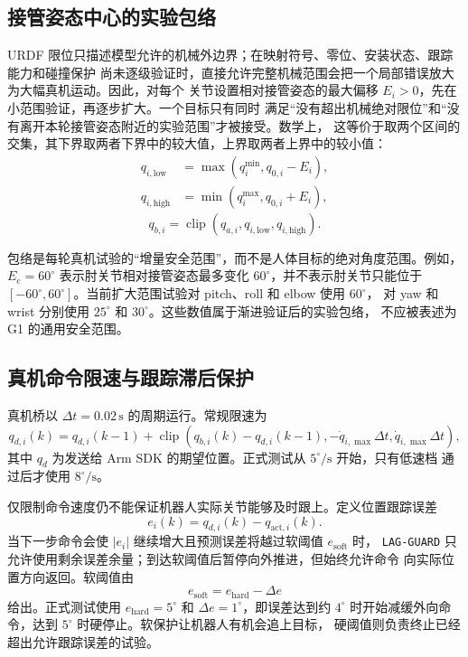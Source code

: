 \subsection{接管姿态中心的实验包络}
\label{subsec:ch5_takeover_envelope}

URDF 限位只描述模型允许的机械外边界；在映射符号、零位、安装状态、跟踪能力和碰撞保护
尚未逐级验证时，直接允许完整机械范围会把一个局部错误放大为大幅真机运动。因此，对每个
关节设置相对接管姿态的最大偏移 $E_i>0$，先在小范围验证，再逐步扩大。一个目标只有同时
满足“没有超出机械绝对限位”和“没有离开本轮接管姿态附近的实验范围”才被接受。数学上，
这等价于取两个区间的交集，其下界取两者下界中的较大值，上界取两者上界中的较小值：
\begin{align}
  q_{i,\mathrm{low}}
  &=\max(q_i^{\min},q_{0,i}-E_i),
  \label{eq:ch5_envelope_low}\\
  q_{i,\mathrm{high}}
  &=\min(q_i^{\max},q_{0,i}+E_i),
  \label{eq:ch5_envelope_high}
\end{align}
\begin{equation}
  q_{b,i}=\operatorname{clip}
  (q_{a,i},q_{i,\mathrm{low}},q_{i,\mathrm{high}}).
  \label{eq:ch5_takeover_envelope_clip}
\end{equation}

包络是每轮真机试验的“增量安全范围”，而不是人体目标的绝对角度范围。例如，
$E_e=60^\circ$ 表示肘关节相对接管姿态最多变化 $60^\circ$，并不表示肘关节只能位于
$[-60^\circ,60^\circ]$。当前扩大范围试验对 pitch、roll 和 elbow 使用 $60^\circ$，
对 yaw 和 wrist 分别使用 $25^\circ$ 和 $30^\circ$。这些数值属于渐进验证后的实验包络，
不应被表述为 G1 的通用安全范围。

\subsection{真机命令限速与跟踪滞后保护}
\label{subsec:ch5_rate_lag_guard}

真机桥以 $\Delta t=0.02\,\mathrm s$ 的周期运行。常规限速为
\begin{equation}
  q_{d,i}(k)=q_{d,i}(k-1)+
  \operatorname{clip}\left(
  q_{b,i}(k)-q_{d,i}(k-1),
  -\dot q_{i,\max}\Delta t,
  \dot q_{i,\max}\Delta t
  \right),
  \label{eq:ch5_bridge_rate_limit}
\end{equation}
其中 $q_d$ 为发送给 Arm SDK 的期望位置。正式测试从 $5^\circ/\mathrm s$ 开始，只有低速档
通过后才使用 $8^\circ/\mathrm s$。

仅限制命令速度仍不能保证机器人实际关节能够及时跟上。定义位置跟踪误差
\begin{equation}
  e_i(k)=q_{d,i}(k)-q_{\mathrm{act},i}(k).
  \label{eq:ch5_tracking_error}
\end{equation}
当下一步命令会使 $|e_i|$ 继续增大且预测误差将越过软阈值 $e_{\mathrm{soft}}$ 时，
\texttt{LAG-GUARD} 只允许使用剩余误差余量；到达软阈值后暂停向外推进，但始终允许命令
向实际位置方向返回。软阈值由
\begin{equation}
  e_{\mathrm{soft}}=e_{\mathrm{hard}}-\Delta e
  \label{eq:ch5_soft_tracking_threshold}
\end{equation}
给出。正式测试使用 $e_{\mathrm{hard}}=5^\circ$ 和 $\Delta e=1^\circ$，即误差达到约
$4^\circ$ 时开始减缓外向命令，达到 $5^\circ$ 时硬停止。软保护让机器人有机会追上目标，
硬阈值则负责终止已经超出允许跟踪误差的试验。


